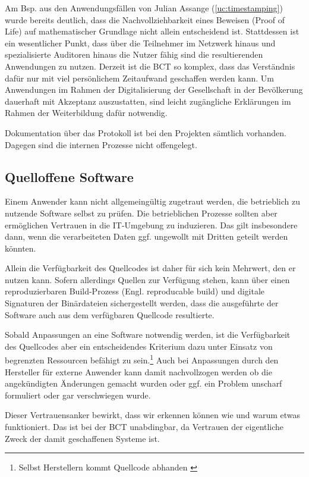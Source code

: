Am Bsp. aus den Anwendungsfällen von Julian Assange (\ref{uc:timestamping}) wurde bereits deutlich, dass die Nachvollziehbarkeit eines Beweisen (Proof of Life) auf mathematischer Grundlage nicht allein entscheidend ist.
Stattdessen ist ein wesentlicher Punkt, dass über die Teilnehmer im Netzwerk hinaus und spezialisierte Auditoren hinaus die Nutzer fähig sind die resultierenden Anwendungen zu nutzen.
Derzeit ist die \gls{BCT} so komplex, dass das Verständnis dafür nur mit viel persönlichem Zeitaufwand geschaffen werden kann.
Um Anwendungen im Rahmen der Digitalisierung der Gesellschaft in der Bevölkerung dauerhaft mit Akzeptanz auszustatten, sind leicht zugängliche Erklärungen im Rahmen der Weiterbildung dafür notwendig.

Dokumentation über das Protokoll ist bei den Projekten sämtlich vorhanden.
Dagegen sind die internen Prozesse nicht offengelegt.

\subsection{Quelloffene Software}\label{krit:opensource}

Einem Anwender kann nicht allgemeingültig zugetraut werden, die betrieblich zu nutzende Software selbst zu prüfen. Die betrieblichen Prozesse sollten aber ermöglichen Vertrauen in die IT-Umgebung zu induzieren. Das gilt insbesondere dann, wenn die verarbeiteten Daten ggf. ungewollt mit Dritten geteilt werden könnten.

Allein die Verfügbarkeit des Quellcodes ist daher für sich kein Mehrwert, den er nutzen kann.
Sofern allerdings Quellen zur Verfügung stehen, kann \ua{} über einen reproduzierbaren Build-Prozess (Engl. reproducable build) und digitale Signaturen der Binärdateien sichergestellt werden, dass die ausgeführte der Software auch aus dem verfügbaren Quellcode resultierte.

Sobald Anpassungen an eine Software notwendig werden, ist die Verfügbarkeit des Quellcodes aber ein entscheidendes Kriterium dazu unter Einsatz von begrenzten Ressourcen befähigt zu sein.\footnote{Selbst Herstellern kommt Quellcode abhanden \autocite{w:ms-binpatch}}
Auch bei Anpassungen durch den Hersteller für externe Anwender kann damit nachvollzogen werden ob die angekündigten Änderungen gemacht wurden oder ggf. ein Problem unscharf formuliert oder gar verschwiegen wurde.

Dieser Vertrauensanker bewirkt, dass wir erkennen können wie und warum etwas funktioniert.
Das ist bei der \gls{BCT} unabdingbar, da Vertrauen der eigentliche Zweck der damit geschaffenen Systeme ist.

